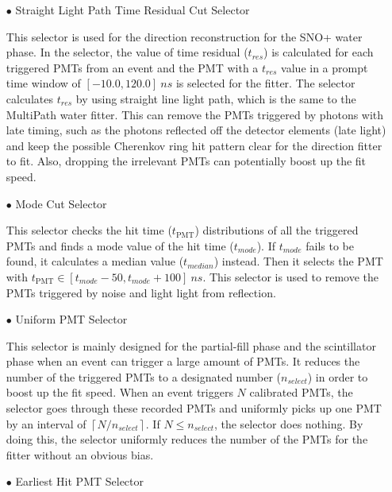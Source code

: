 \begin{itemize}
\item[$\bullet$] Straight Light Path Time Residual Cut Selector

This selector is used for the direction reconstruction for the SNO+ water phase. In the selector, the value of time residual ($t_{res}$) is calculated for each triggered PMTs from an event and the PMT with a $t_{res}$ value in a prompt time window of $[-10.0, 120.0]~ns$ is selected for the fitter. The selector calculates $t_{res}$ by using straight line light path, which is the same to the MultiPath water fitter. This can remove the PMTs triggered by photons with late timing, such as the photons reflected off the detector elements (late light) and keep the possible Cherenkov ring hit pattern clear for the direction fitter to fit. Also, dropping the irrelevant PMTs can potentially boost up the fit speed.

\item[$\bullet$] Mode Cut Selector

This selector checks the hit time ($t_\mathrm{PMT}$) distributions of all the triggered PMTs and finds a mode value of the hit time ($t_{mode}$). If $t_{mode}$ fails to be found, it calculates a median value ($t_{median}$) instead. Then it selects the PMT with $t_\mathrm{PMT} \in [t_{mode}-50, t_{mode}+100]~ns$. This selector is used to remove the　PMTs triggered by noise and light light from reflection\cite{modeCut}.

\item[$\bullet$] Uniform PMT Selector

This selector is mainly designed for the partial-fill phase and the scintillator phase when an event can trigger a large amount of PMTs. It reduces the number of the triggered PMTs to a designated number ($n_{select}$) in order to boost up the fit speed. When an event triggers $N$ calibrated PMTs, the selector goes through these recorded PMTs and uniformly picks up one PMT by an interval of $\left \lceil{N/n_{select}}\right \rceil $. If $N\leq n_{select}$, the selector does nothing. By doing this, the selector uniformly reduces the number of the PMTs for the fitter without an obvious bias.

\item[$\bullet$] Earliest Hit PMT Selector


\end{itemize}
